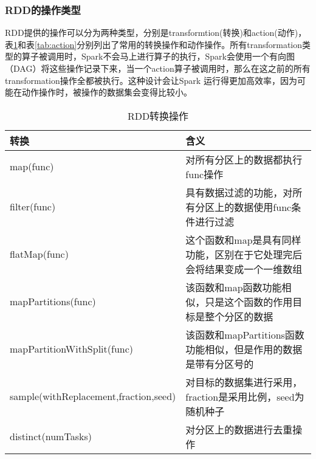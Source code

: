 \subsubsection{RDD的操作类型}
RDD提供的操作可以分为两种类型，分别是transformtion(转换)和action(动作)，表\ref{tab:trans}和表\ref{tab:action}分别列出了常用的转换操作和动作操作。所有transformation类型的算子被调用时，Spark不会马上进行算子的执行，Spark会使用一个有向图（DAG）将这些操作记录下来，当一个action算子被调用时，那么在这之前的所有transformation操作全都被执行。这种设计会让Spark 运行得更加高效率，因为可能在动作操作时，被操作的数据集会变得比较小。
\begin{table}[h] %
\caption{RDD转换操作} %
\centering
\label{tab:trans}
\begin{tabular}{p{6cm}|p{8cm}} %
\hline
\hline
转换  & 含义 \\ %
\hline %
map(func)  & 对所有分区上的数据都执行func操作\\
\hline
filter(func)  & 具有数据过滤的功能，对所有分区上的数据使用func条件进行过滤\\
\hline
flatMap(func)  & 这个函数和map是具有同样功能，区别在于它处理完后会将结果变成一个一维数组\\
\hline
mapPartitions(func) & 该函数和map函数功能相似，只是这个函数的作用目标是整个分区的数据\\
\hline
mapPartitionWithSplit(func) & 该函数和mapPartitions函数功能相似，但是作用的数据是带有分区号的\\
\hline
sample(withReplacement,fraction,seed) & 对目标的数据集进行采用，fraction是采用比例，seed为随机种子\\
\hline
distinct(numTasks) &对分区上的数据进行去重操作\\
\hline
\hline
\end{tabular}
\end{table}

